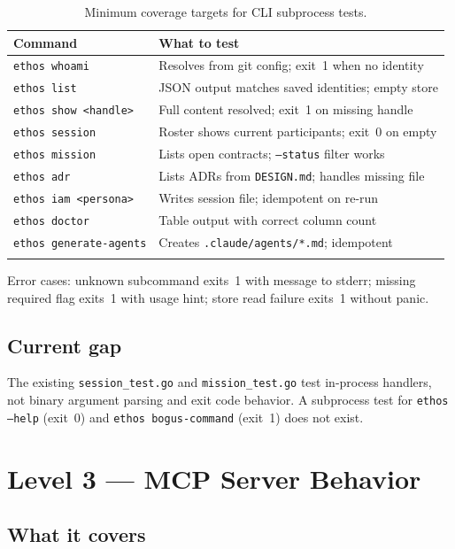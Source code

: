 \documentclass[a4paper,10pt]{article}
\newcommand{\cmd}[1]{\texttt{#1}}
\newcommand{\fpath}[1]{\texttt{#1}}
\begin{document}
\begin{longtable}{ll}
\toprule
\textbf{Command} & \textbf{What to test} \\
\midrule
\endhead
\cmd{ethos whoami}        & Resolves from git config; exit~1 when no identity \\
\cmd{ethos list}          & JSON output matches saved identities; empty store \\
\cmd{ethos show <handle>} & Full content resolved; exit~1 on missing handle \\
\cmd{ethos session}       & Roster shows current participants; exit~0 on empty \\
\cmd{ethos mission}       & Lists open contracts; \texttt{--status} filter works \\
\cmd{ethos adr}           & Lists ADRs from \fpath{DESIGN.md}; handles missing file \\
\cmd{ethos iam <persona>} & Writes session file; idempotent on re-run \\
\cmd{ethos doctor}        & Table output with correct column count \\
\cmd{ethos generate-agents} & Creates \fpath{.claude/agents/*.md}; idempotent \\
\bottomrule
\caption{Minimum coverage targets for CLI subprocess tests.}
\end{longtable}

Error cases: unknown subcommand exits~1 with message to stderr; missing
required flag exits~1 with usage hint; store read failure exits~1
without panic.

\subsection*{Current gap}

The existing \fpath{session\_test.go} and \fpath{mission\_test.go}
test in-process handlers, not binary argument parsing and exit code
behavior.  A subprocess test for \cmd{ethos --help} (exit~0) and
\cmd{ethos bogus-command} (exit~1) does not exist.

\section{Level 3 --- MCP Server Behavior}

\subsection*{What it covers}
\end{document}

